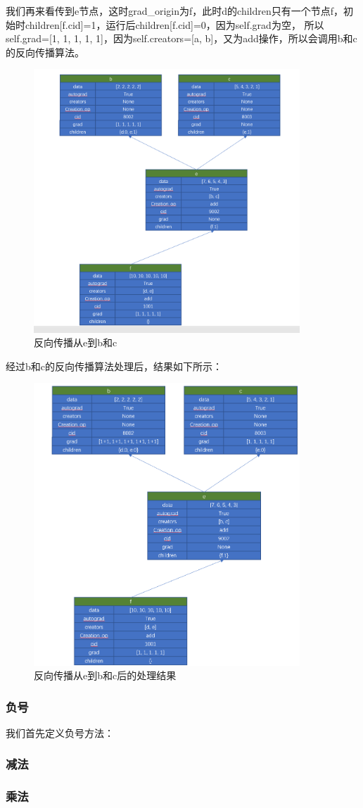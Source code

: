 我们再来看传到e节点，这时grad\_origin为f，此时d的children只有一个节点f，初始时children[f.cid]=1，运行后children[f.cid]=0，因为self.grad为空，
所以self.grad=[1, 1, 1, 1, 1]，因为self.creators=[a, b]，又为add操作，所以会调用b和c的反向传播算法。
\begin{figure}[h]
	\caption{反向传播从e到b和c}
	\label{p000021}
	\centering
	\includegraphics[width=10cm]{images/p000021}
\end{figure}
经过b和c的反向传播算法处理后，结果如下所示：
\begin{figure}[h]
	\caption{反向传播从e到b和c后的处理结果}
	\label{p000022}
	\centering
	\includegraphics[width=10cm]{images/p000022}
\end{figure}

\subsubsection{负号}
我们首先定义负号方法：


\subsubsection{减法}

\subsubsection{乘法}